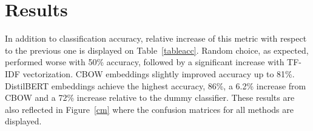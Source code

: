 \thispagestyle{plain}

\section{Results}

In addition to  classification accuracy, relative increase of this metric with respect to the previous one is displayed on Table~\ref{tableacc}. Random choice, as expected, performed worse with 50\% accuracy, followed by a significant increase with TF-IDF vectorization. CBOW embeddings slightly improved accuracy up to 81\%. DistilBERT embeddings achieve the highest accuracy, 86\%, a 6.2\% increase from CBOW and a 72\% increase relative to the dummy classifier. These results are also reflected in Figure~\ref{cm} where the confusion matrices for all methods are displayed.

\begin{table}[h]
	\centering
\caption{Accuracy for different vectorization/embeddings.}
\label{tableacc}
\end{table}



